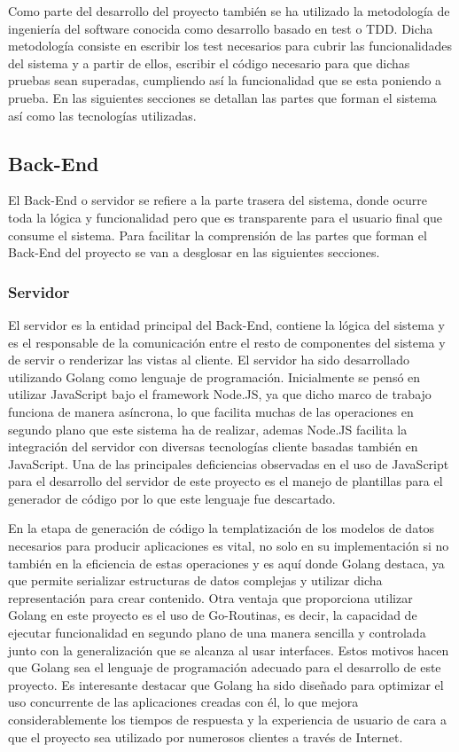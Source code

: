 \documentclass[a4paper,11pt]{book}
\begin{document}
Como parte del desarrollo del proyecto también se ha utilizado la metodología de ingeniería del software conocida como desarrollo basado en test o TDD. Dicha metodología consiste en escribir los test necesarios para cubrir las funcionalidades del sistema y a partir de ellos, escribir el código necesario para que dichas pruebas sean superadas, cumpliendo así la funcionalidad que se esta poniendo a prueba.  En las siguientes secciones se detallan las partes que forman el sistema así como las tecnologías utilizadas. 

\subsection{Back-End}

El Back-End o servidor se refiere a la parte trasera del sistema, donde ocurre toda la lógica y funcionalidad pero que es transparente para el usuario final que consume el sistema. Para facilitar la comprensión de las partes que forman  el Back-End del proyecto se van a desglosar en las siguientes secciones.

\subsubsection{Servidor}

El servidor es la entidad principal del Back-End, contiene la lógica del sistema y es el responsable de la comunicación entre el resto de componentes del sistema y de servir o renderizar las vistas al cliente.
El servidor ha sido desarrollado utilizando Golang\cite{go} como lenguaje de programación. Inicialmente se pensó en utilizar JavaScript bajo el framework Node.JS, ya que dicho marco de trabajo funciona de manera asíncrona, lo que facilita muchas de las operaciones en segundo plano que este sistema ha de realizar, ademas Node.JS facilita la integración del servidor con diversas tecnologías cliente basadas también en JavaScript. Una de las principales deficiencias  observadas en el uso de JavaScript para el desarrollo del servidor de este proyecto es el manejo de plantillas para el generador de código por lo que este lenguaje fue descartado.

En la etapa de generación de código la templatización de los modelos de datos necesarios para producir aplicaciones es vital, no solo en su implementación si no también en la eficiencia de estas operaciones y es aquí donde Golang destaca, ya que permite serializar estructuras de datos complejas y utilizar dicha representación para crear contenido. Otra ventaja que proporciona utilizar Golang en este proyecto es el uso de Go-Routinas, es decir, la capacidad de ejecutar funcionalidad en segundo plano de una manera sencilla y controlada junto con la generalización que se alcanza al usar interfaces. Estos motivos hacen que Golang sea el lenguaje de programación adecuado para el desarrollo de este proyecto.  Es interesante destacar que Golang ha sido diseñado para optimizar el uso concurrente de las aplicaciones creadas con él, lo que mejora considerablemente los tiempos de respuesta y la experiencia de usuario de cara a que el proyecto sea utilizado por numerosos clientes a través de Internet.
\end{document}
